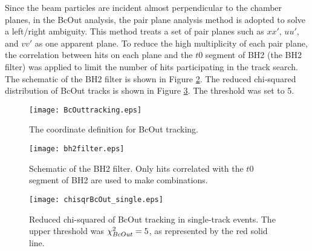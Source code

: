 Since the beam particles are incident almost perpendicular to the chamber planes, in the BcOut analysis, the pair plane analysis method is adopted to solve a left/right ambiguity. This method treats a set of pair planes such as $xx'$, $uu'$, and $vv'$ as one apparent plane. To reduce the high multiplicity of each pair plane, the correlation between hits on each plane and the $t0$ segment of BH2 (the BH2 filter) was applied to limit the number of hits participating in the track search. The schematic of the BH2 filter is shown in Figure \ref{fig-bh2filter}. The reduced chi-squared distribution of BcOut tracks is shown in Figure \ref{fig-chisqrBcOut}. The threshold was set to 5.

\begin{figure}[!h]
  \begin{center}
    \texttt{[image: BcOuttracking.eps]}
    \caption{The coordinate definition for BcOut tracking.}
    \label{fig-BcOuttracking}
  \end{center}
\end{figure}

\begin{figure}[!h]
  \begin{center}
    \texttt{[image: bh2filter.eps]}
    \caption{Schematic of the BH2 filter. Only hits correlated with the $t0$ segment of BH2 are used to make combinations.}
    \label{fig-bh2filter}
  \end{center}
\end{figure}

\begin{figure}[!h]
  \begin{center}
    \texttt{[image: chisqrBcOut\_single.eps]}
    \caption{Reduced chi-squared of BcOut tracking in single-track events. The upper threshold was $\chi^{2}_{BcOut}=5$, as represented by the red solid line.}
    \label{fig-chisqrBcOut}
  \end{center}
\end{figure}

